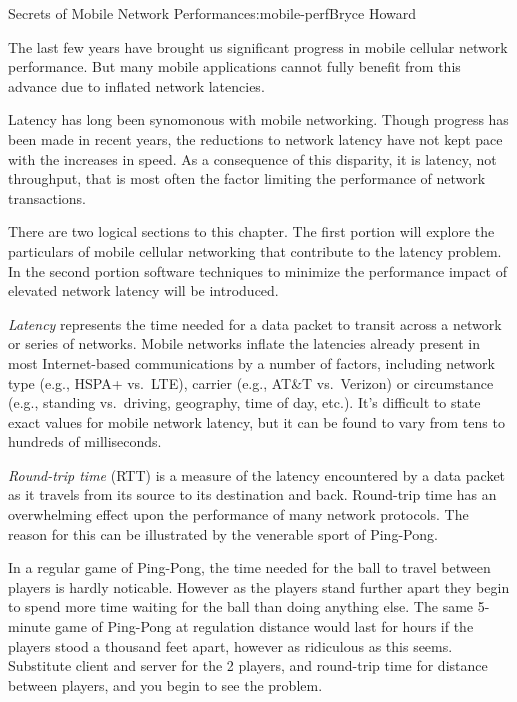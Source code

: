\begin{aosachapter}{Secrets of Mobile Network Performance}{s:mobile-perf}{Bryce Howard}


The last few years have brought us significant progress in mobile
cellular network performance. But many mobile applications cannot fully
benefit from this advance due to inflated network latencies.

Latency has long been synomonous with mobile networking. Though progress
has been made in recent years, the reductions to network latency have
not kept pace with the increases in speed. As a consequence of this
disparity, it is latency, not throughput, that is most often the factor
limiting the performance of network transactions.

There are two logical sections to this chapter. The first portion will
explore the particulars of mobile cellular networking that contribute to
the latency problem. In the second portion software techniques to
minimize the performance impact of elevated network latency will be
introduced.


\emph{Latency} represents the time needed for a data packet to transit
across a network or series of networks. Mobile networks inflate the
latencies already present in most Internet-based communications by a
number of factors, including network type (e.g., HSPA+ vs.~LTE), carrier
(e.g., AT\&T vs.~Verizon) or circumstance (e.g., standing vs.~driving,
geography, time of day, etc.). It's difficult to state exact values for
mobile network latency, but it can be found to vary from tens to
hundreds of milliseconds.

\emph{Round-trip time} (RTT) is a measure of the latency encountered by
a data packet as it travels from its source to its destination and back.
Round-trip time has an overwhelming effect upon the performance of many
network protocols. The reason for this can be illustrated by the
venerable sport of Ping-Pong.

In a regular game of Ping-Pong, the time needed for the ball to travel
between players is hardly noticable. However as the players stand
further apart they begin to spend more time waiting for the ball than
doing anything else. The same 5-minute game of Ping-Pong at regulation
distance would last for hours if the players stood a thousand feet
apart, however as ridiculous as this seems. Substitute client and server
for the 2 players, and round-trip time for distance between players, and
you begin to see the problem.


\end{aosachapter}
